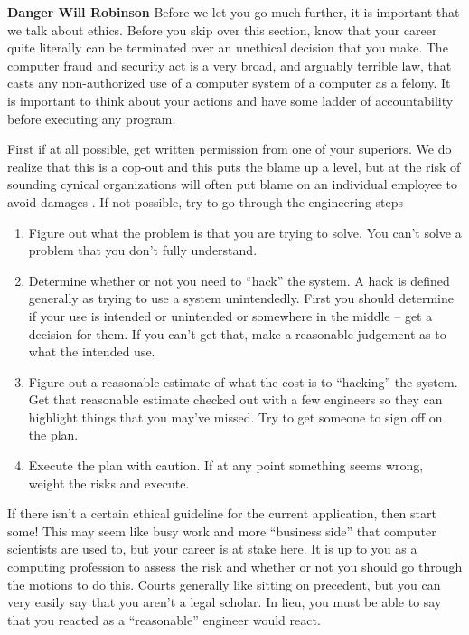 \textbf{Danger Will Robinson} Before we let you go much further, it is important that we talk about ethics.
Before you skip over this section, know that your career quite literally can be terminated over an unethical decision that you make.
The computer fraud and security act is a very broad, and arguably terrible law, that casts any non-authorized use of a computer system of a computer as a felony.
It is important to think about your actions and have some ladder of accountability before executing any program.

First if at all possible, get written permission from one of your superiors.
We do realize that this is a cop-out and this puts the blame up a level, but at the risk of sounding cynical organizations will often put blame on an individual employee to avoid damages .
If not possible, try to go through the engineering steps

\begin{enumerate}
\item Figure out what the problem is that you are trying to solve. You can't solve a problem that you don't fully understand.
\item Determine whether or not you need to ``hack'' the system. A hack is defined generally as trying to use a system unintendedly. First you should determine if your use is intended or unintended or somewhere in the middle -- get a decision for them. If you can't get that, make a reasonable judgement as to what the intended use.
\item Figure out a reasonable estimate of what the cost is to ``hacking'' the system. Get that reasonable estimate checked out with a few engineers so they can highlight things that you may've missed. Try to get someone to sign off on the plan.
\item Execute the plan with caution. If at any point something seems wrong, weight the risks and execute.
\end{enumerate}

If there isn't a certain ethical guideline for the current application, then start some!
This may seem like busy work and more ``business side'' that computer scientists are used to, but your career is at stake here.
It is up to you as a computing profession to assess the risk and whether or not you should go through the motions to do this.
Courts generally like sitting on precedent, but you can very easily say that you aren't a legal scholar.
In lieu, you must be able to say that you reacted as a ``reasonable'' engineer would react.

